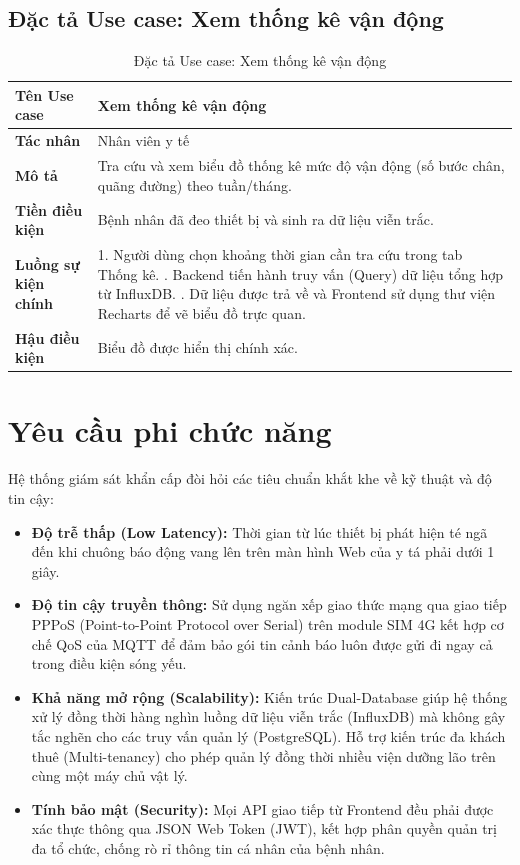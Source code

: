 \documentclass[../DoAn.tex]{subfiles}
\begin{document}
\subsection{Đặc tả Use case: Xem thống kê vận động}
\begin{table}[H]
    \centering
    \caption{Đặc tả Use case: Xem thống kê vận động}
    \label{tab:uc_thong_ke}
    \begin{tabular}{|p{4cm}|p{10.5cm}|}
        \hline
        \textbf{Tên Use case} & \textbf{Xem thống kê vận động} \\ \hline
        \textbf{Tác nhân} & Nhân viên y tế \\ \hline
        \textbf{Mô tả} & Tra cứu và xem biểu đồ thống kê mức độ vận động (số bước chân, quãng đường) theo tuần/tháng. \\ \hline
        \textbf{Tiền điều kiện} & Bệnh nhân đã đeo thiết bị và sinh ra dữ liệu viễn trắc. \\ \hline
        \textbf{Luồng sự kiện chính} &
        1. Người dùng chọn khoảng thời gian cần tra cứu trong tab Thống kê. \newline
        2. Backend tiến hành truy vấn (Query) dữ liệu tổng hợp từ InfluxDB. \newline
        3. Dữ liệu được trả về và Frontend sử dụng thư viện Recharts để vẽ biểu đồ trực quan. \\ \hline
        \textbf{Hậu điều kiện} & Biểu đồ được hiển thị chính xác. \\ \hline
    \end{tabular}
\end{table}

\section{Yêu cầu phi chức năng}
\label{section:2.4}
Hệ thống giám sát khẩn cấp đòi hỏi các tiêu chuẩn khắt khe về kỹ thuật và độ tin cậy:
\begin{itemize}
    \item \textbf{Độ trễ thấp (Low Latency):} Thời gian từ lúc thiết bị phát hiện té ngã đến khi chuông báo động vang lên trên màn hình Web của y tá phải dưới 1 giây.
    \item \textbf{Độ tin cậy truyền thông:} Sử dụng ngăn xếp giao thức mạng qua giao tiếp PPPoS (Point-to-Point Protocol over Serial) trên module SIM 4G kết hợp cơ chế QoS của MQTT để đảm bảo gói tin cảnh báo luôn được gửi đi ngay cả trong điều kiện sóng yếu.
    \item \textbf{Khả năng mở rộng (Scalability):} Kiến trúc Dual-Database giúp hệ thống xử lý đồng thời hàng nghìn luồng dữ liệu viễn trắc (InfluxDB) mà không gây tắc nghẽn cho các truy vấn quản lý (PostgreSQL). Hỗ trợ kiến trúc đa khách thuê (Multi-tenancy) cho phép quản lý đồng thời nhiều viện dưỡng lão trên cùng một máy chủ vật lý.
    \item \textbf{Tính bảo mật (Security):} Mọi API giao tiếp từ Frontend đều phải được xác thực thông qua JSON Web Token (JWT), kết hợp phân quyền quản trị đa tổ chức, chống rò rỉ thông tin cá nhân của bệnh nhân.
\end{itemize}
\end{document}
